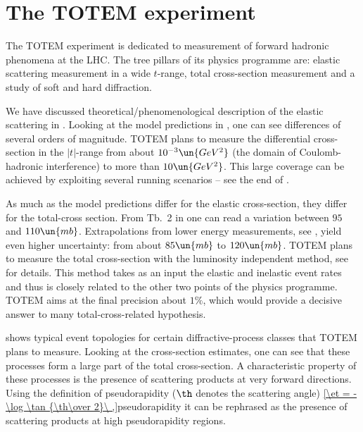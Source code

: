 \iffalse
TOTEM, RP, T1, T2, IP, BPM, BLM
\fi

\chapter[ttm]{The TOTEM experiment}



The TOTEM experiment  is dedicated to measurement of forward hadronic phenomena at the LHC. The tree pillars of its physics programme are:
\> elastic scattering measurement in a wide $t$-range,
\> total cross-section measurement and
\> a study of soft and hard diffraction.


We have discussed theoretical/phenomenological description of the elastic scattering in . Looking at the model predictions in , one can see differences of several orders of magnitude. TOTEM plans to measure the differential cross-section in the $|t|$-range from about $10^{-3}\un{GeV^2}$ (the domain of Coulomb-hadronic interference) to more than $10\un{GeV^2}$. This large coverage can be achieved by exploiting several running scenarios -- see the end of . 

As much as the model predictions differ for the elastic cross-section, they differ for the total-cross section. From Tb.~2 in  one can read a variation between $95$ and $110\un{mb}$. Extrapolations from lower energy measurements, see , yield even higher uncertainty: from about $85\un{mb}$ to $120\un{mb}$. TOTEM plans to measure the total cross-section with the luminosity independent method, see  for details. This method takes as an input the elastic and inelastic event rates and thus is closely related to the other two points of the physics programme. TOTEM aims at the final precision about $1\percent$, which would provide a decisive answer to many total-cross-related hypothesis.

 shows typical event topologies for certain diffractive-process classes that TOTEM plans to measure. Looking at the cross-section estimates, one can see that these processes form a large part of the total cross-section. A characteristic property of these processes is the presence of scattering products at very forward directions. Using the definition of pseudorapidity ($\th$ denotes the scattering angle)
\eqref{\et = - \log \tan {\th\over 2}\ ,}{pseudorapidity}
it can be rephrased as the presence of scattering products at high pseudorapidity regions. 

